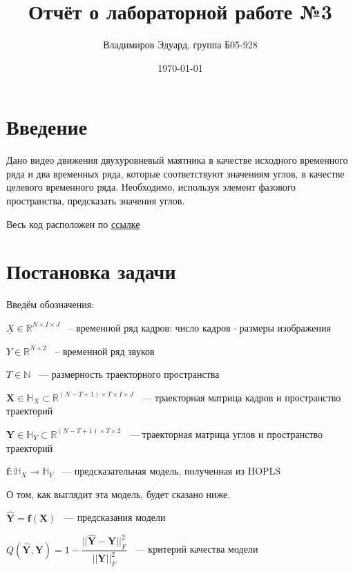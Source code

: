 \documentclass[a4paper,14pt]{article}
\author{Владимиров Эдуард, группа Б05-928}
\title{\textbf{Отчёт о лабораторной работе №3}}
\date{\today}
\newcommand{\uX}{\ensuremath{\underline{X}}}
\newcommand{\dH}{\mathbb{H}}
\newcommand{\dR}{\mathbb{R}}
\renewcommand{\bf}{\mathbf{f}}
\newcommand{\bX}{\mathbf{X}}
\newcommand{\bY}{\mathbf{Y}}
\theoremstyle{plain} %
\theoremstyle{definition} %
\theoremstyle{remark} %
\begin{document}
	\maketitle
	
	\section{Введение}
	Дано видео движения двухуровневый маятника в качестве исходного временного ряда и два временных ряда, которые соответствуют значениям углов, в качестве целевого временного ряда. 
	Необходимо, используя элемент фазового пространства, предсказать значения углов.  
	
	Весь код расположен по \href{https://colab.research.google.com/drive/1IIDZnvOCLYjBrD2ZFDvN9OzSxRKVDZBv?usp=share_link}{ссылке}
	
	\section{Постановка задачи}
	Введём обозначения:  
	
	$\uX \in \dR^{N \times I \times J}$ ~-- временной ряд кадров: число кадров $\cdot$ размеры изображения
	
	$Y \in \dR^{N \times 2}$ ~-- временной ряд звуков
	
	$T \in \mathbb{N}$ ~--- размерность траекторного пространства
	
	$\bX \in \dH_X \subset \mathbb{R}^{(N-T+1) \times T \times I \times J}$ ~--- траекторная матрица кадров и пространство траекторий
	
	$\bY \in \dH_Y \subset \mathbb{R}^{(N-T+1) \times T \times 2}$ ~--- траекторная матрица углов и пространство траекторий 
	
	
	$\bf: \dH_X \rightarrow \dH_Y$ ~--- предсказательная модель, полученная из HOPLS
	
	О том, как выглядит эта модель, будет сказано ниже.
	
	$\widehat{\bY} = \bf(\bX)$ ~--- предсказания модели
	
	$Q\left( \widehat{\bY}, \bY \right) = 1 - \dfrac{|| \widehat{\bY} - \bY||_F^2}{|| \bY ||_F^2}$ ~--- критерий качества модели
	
\end{document}
